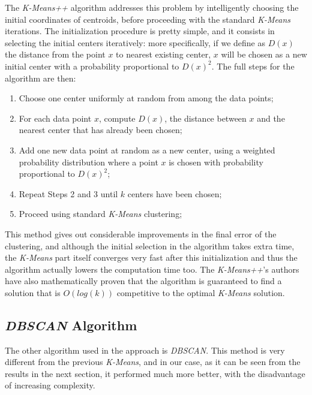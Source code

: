\documentclass[12pt,a4paper,cucitura]{toptesi}
\begin{document}
The \emph{K-Means++} algorithm addresses this problem by intelligently choosing the initial coordinates of centroids, before proceeding with the standard \emph{K-Means} iterations.
The initialization procedure is pretty simple, and it consists in selecting the initial centers iteratively: more specifically, if we define as $D(x)$ the distance from the point $x$ to nearest existing center, $x$ will be chosen as a new initial center with a probability proportional to $D(x)^2$.
The full steps for the algorithm are then:

\begin{enumerate}
\item Choose one center uniformly at random from among the data points;
\item For each data point $x$, compute $D(x)$, the distance between $x$ and the nearest center that has already been chosen;
\item Add one new data point at random as a new center, using a weighted probability distribution where a point $x$ is chosen with probability proportional to $D(x)^2$;
\item Repeat Steps 2 and 3 until $k$ centers have been chosen;
\item Proceed using standard \emph{K-Means} clustering;
\end{enumerate}

This method gives out considerable improvements in the final error of the clustering, and although the initial selection in the algorithm takes extra time, the \emph{K-Means} part itself converges very fast after this initialization and thus the algorithm actually lowers the computation time too.
The \emph{K-Means++}'s authors have also mathematically proven \cite{kmeanspp} that the algorithm is guaranteed to find a solution that is $O(log (k))$ competitive to the optimal \emph{K-Means} solution.

\subsection{\emph{DBSCAN} Algorithm}

The other algorithm used in the approach is \emph{DBSCAN}.
This method is very different from the previous \emph{K-Means}, and in our case, as it can be seen from the results in the next section, it performed much more better, with the disadvantage of increasing complexity.
\end{document}
